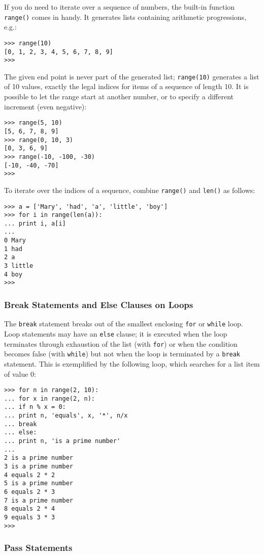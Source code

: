 If you do need to iterate over a sequence of numbers, the built-in
function {\tt range()} comes in handy.
It generates lists containing arithmetic progressions,
e.g.:
\bcode\begin{verbatim}
>>> range(10)
[0, 1, 2, 3, 4, 5, 6, 7, 8, 9]
>>>
\end{verbatim}\ecode
The given end point is never part of the generated list;
{\tt range(10)} generates a list of 10 values,
exactly the legal indices for items of a sequence of length 10.
It is possible to let the range start at another number, or to specify a
different increment (even negative):
\bcode\begin{verbatim}
>>> range(5, 10)
[5, 6, 7, 8, 9]
>>> range(0, 10, 3)
[0, 3, 6, 9]
>>> range(-10, -100, -30)
[-10, -40, -70]
>>>
\end{verbatim}\ecode
To iterate over the indices of a sequence, combine {\tt range()}
and {\tt len()} as follows:
\bcode\begin{verbatim}
>>> a = ['Mary', 'had', 'a', 'little', 'boy']
>>> for i in range(len(a)):
... print i, a[i]
...
0 Mary
1 had
2 a
3 little
4 boy
>>>
\end{verbatim}\ecode

\subsubsection{Break Statements and Else Clauses on Loops}

The {\tt break} statement breaks out of the smallest enclosing {\tt for}
or {\tt while} loop.
Loop statements may have an {\tt else} clause; it is executed when the
loop terminates through exhaustion of the list (with {\tt for}) or when
the condition becomes false (with {\tt while}) but not when the loop is
terminated by a {\tt break} statement.
This is exemplified by the following loop, which searches for a list
item of value 0:
\bcode\begin{verbatim}
>>> for n in range(2, 10):
... for x in range(2, n):
... if n % x = 0:
... print n, 'equals', x, '*', n/x
... break
... else:
... print n, 'is a prime number'
...
2 is a prime number
3 is a prime number
4 equals 2 * 2
5 is a prime number
6 equals 2 * 3
7 is a prime number
8 equals 2 * 4
9 equals 3 * 3
>>>
\end{verbatim}\ecode

\subsubsection{Pass Statements}

